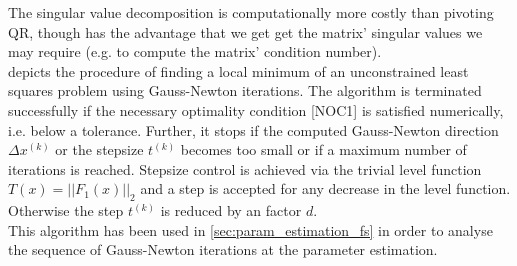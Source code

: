 \documentclass{scrartcl}[12pt, halfparskip]
\numberwithin{equation}{section}
\numberwithin{figure}{section}
\numberwithin{table}{section}
\begin{document}
The singular value decomposition is computationally more costly than pivoting QR, though has the advantage that we get get the matrix' singular values we may require (e.g. to compute the matrix' condition number). \\

 depicts the procedure of finding a local minimum of an unconstrained least squares problem using Gauss-Newton iterations. The algorithm is terminated successfully if the necessary optimality condition [NOC1] is satisfied numerically, i.e. below a tolerance. Further, it stops if the computed Gauss-Newton direction $\Delta x^{(k)}$ or the stepsize $t^{(k)}$ becomes too small or if a maximum number of iterations is reached. Stepsize control is achieved via the trivial level function $T(x) = ||F_1(x)||_2$ and a step is accepted for any decrease in the level function. Otherwise the step $t^{(k)}$ is reduced by an factor $d$. \\
This algorithm has been used in \cref{sec:param_estimation_fs} in order to analyse the sequence of Gauss-Newton iterations at the parameter estimation.  \\
\end{document}
